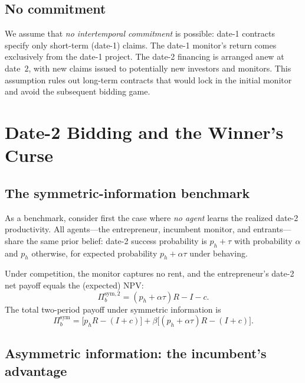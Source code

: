 \documentclass[11pt,a4paper,oneside]{book}
\theoremstyle{plain}
\theoremstyle{definition}
\theoremstyle{remark}
\numberwithin{equation}{chapter}
\begin{document}
\subsection{No commitment}

We assume that \emph{no intertemporal commitment} is possible: date-1 contracts specify only short-term (date-1) claims.
The date-1 monitor's return comes exclusively from the date-1 project.
The date-2 financing is arranged anew at date~$2$, with new claims issued to potentially new investors and monitors.
This assumption rules out long-term contracts that would lock in the initial monitor and avoid the subsequent bidding game.

\section{Date-2 Bidding and the Winner's Curse}
\label{sec:mon-date2}

\subsection{The symmetric-information benchmark}

As a benchmark, consider first the case where \emph{no agent} learns the realized date-2 productivity.
All agents---the entrepreneur, incumbent monitor, and entrants---share the same prior belief: date-2 success probability is $p_h + \tau$ with probability $\alpha$ and $p_h$ otherwise, for expected probability $p_h + \alpha \tau$ under behaving.

Under competition, the monitor captures no rent, and the entrepreneur's date-2 net payoff equals the (expected) NPV:
\begin{equation}\label{eq:mon-sym-date2}
  \Pi_b^{\text{sym},2} = (p_h + \alpha \tau) R - I - c.
\end{equation}
The total two-period payoff under symmetric information is
\begin{equation}\label{eq:mon-sym-total}
  \Pi_b^{\text{sym}} = \bigl[p_h R - (I + c)\bigr] + \beta \bigl[(p_h + \alpha \tau) R - (I + c)\bigr].
\end{equation}

\subsection{Asymmetric information: the incumbent's advantage}
\end{document}
